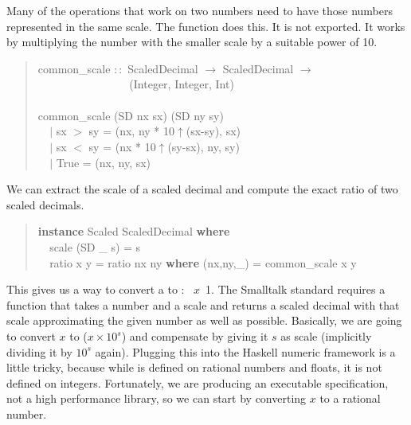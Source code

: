 \documentclass[prodmode,acmtoplas]{acmsmall}
\begin{document}
Many of the operations that work on two numbers need to have
those numbers represented in the same scale.  The function
 does this.  It is not exported.  It works
by multiplying the number with the smaller scale by a suitable
power of 10.

\begin{quote}
\begin{tabbing}
\sffamily common\_scale $::$ ScaledDecimal $\rightarrow$ ScaledDecimal $\rightarrow$\\
\verb|                |\sffamily                (Integer, Integer, Int)\\
\\
\sffamily common\_scale (SD nx sx) (SD ny sy)\\
\verb|  |\sffamily  $|$ sx $>$ sy = (nx, ny * 10$\uparrow$(sx-sy), sx)\\
\verb|  |\sffamily  $|$ sx $<$ sy = (nx * 10$\uparrow$(sy-sx), ny, sy)\\
\verb|  |\sffamily  $|$ True    = (nx,              ny, sx)
\end{tabbing}
\end{quote}

We can extract the scale of a scaled decimal and compute the
exact ratio of two scaled decimals.

\begin{quote}
\begin{tabbing}
\sffamily \textbf{instance} Scaled ScaledDecimal \textbf{where}\\
\verb|  |\sffamily  scale (SD \_ s) = s\\
\verb|  |\sffamily  ratio x y = ratio nx ny \textbf{where} (nx,ny,\_) = common\_scale x y
\end{tabbing}
\end{quote}

This gives us a way to convert a  to
:
~$x$~1.  The Smalltalk standard requires a function
that takes a number and a scale and returns a scaled decimal
with that scale approximating the given number as well as possible.
Basically, we are going to convert $x$ to ($x\times 10^s$)
and compensate by giving it $s$ as scale (implicitly dividing it by
$10^s$ again).
Plugging this into the Haskell numeric framework is a little tricky,
because while  is defined on rational numbers and floats,
it is not defined on integers.  Fortunately, we are producing an
executable specification, not a high performance library, so we can
start by converting $x$ to a rational number.
\end{document}
